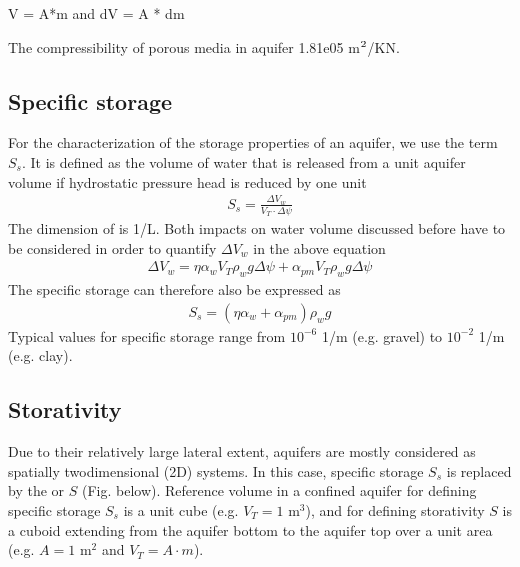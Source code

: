 \documentclass[letterpaper,10pt,english]{sphinxmanual}
\begin{document}
\begin{sphinxVerbatim}[commandchars=\\\{\}]
V = A*m and dV = A * dm 

The compressibility of porous media in aquifer 1.81e\PYGZhy{}05 m\(\sp{\text{2}}\)/KN.
\end{sphinxVerbatim}


\subsection{Specific storage}
\label{\detokenize{contents/flow/lecture_03/13_gw_storage:specific-storage}}
For the characterization of the storage properties of an aquifer, we use the term  \(S_s\). It is defined as the volume of water that is released from a unit aquifer volume if hydrostatic pressure head is reduced by one unit
\begin{equation*}
\begin{split}
S_s = \frac{\Delta V_w}{V_T \cdot \Delta \psi}
\end{split}
\end{equation*}
The dimension of  is 1/L. Both impacts on water volume discussed before have to be considered in order to quantify \(\Delta V_w\) in the above equation
\begin{equation*}
\begin{split}
\Delta V_w = \eta \alpha_w V_T \rho_w g \Delta \psi + \alpha_{pm} V_T\rho_w g \Delta \psi
\end{split}
\end{equation*}
The specific storage can therefore also be expressed as
\begin{equation*}
\begin{split}
S_s = (\eta \alpha_w + \alpha_{pm})\rho_w g
\end{split}
\end{equation*}
Typical values for specific storage range from \(10^{-6}\) 1/m (e.g. gravel) to \(10^{-2}\) 1/m (e.g. clay).


\subsection{Storativity}
\label{\detokenize{contents/flow/lecture_03/13_gw_storage:storativity}}
Due to their relatively large lateral extent, aquifers are mostly considered as spatially two\sphinxhyphen{}dimensional (2D) systems. In this case, specific storage \(S_s\) is replaced by the  or  \(S\) (Fig. below). Reference volume in a confined aquifer for defining specific storage \(S_s\) is a unit cube (e.g. \(V_T = 1\) m\(^3\)), and for defining storativity \(S\) is a cuboid extending from the aquifer bottom to the aquifer top over a unit area (e.g. \(A = 1\) m\(^2\) and \(V_T = A\cdot m\)).
\end{document}
